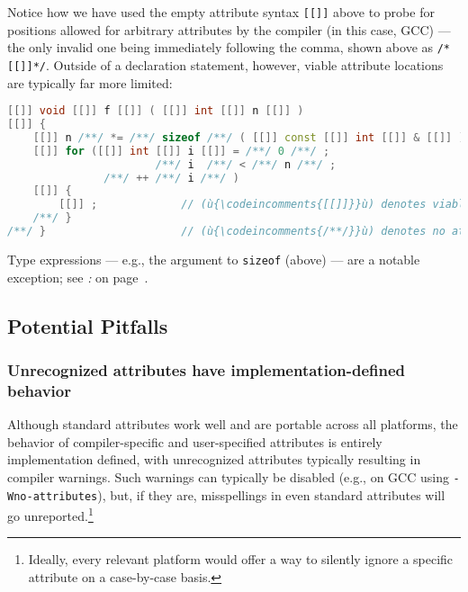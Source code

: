 \noindent Notice how we have used the empty attribute syntax \texttt{[[]]} above
to probe for positions allowed for arbitrary attributes by the compiler
(in this case, GCC) --- the only invalid one being immediately following
the comma, shown above as \texttt{/*[[]]*/}. Outside of a declaration
statement, however, viable attribute locations are typically far more
limited:

\begin{lstlisting}[language=C++,label=attribute-gcc-example]
[[]] void [[]] f [[]] ( [[]] int [[]] n [[]] )
[[]] {
    [[]] n /**/ *= /**/ sizeof /**/ ( [[]] const [[]] int [[]] & [[]] ) /**/;
    [[]] for ([[]] int [[]] i [[]] = /**/ 0 /**/ ;
                       /**/ i  /**/ < /**/ n /**/ ;
               /**/ ++ /**/ i /**/ )
    [[]] {
        [[]] ;             // (ù{\codeincomments{[[]]}}ù) denotes viable attribute location (on GCC)
    /**/ }
/**/ }                     // (ù{\codeincomments{/**/}}ù) denotes no attribute allowed (on GCC)
\end{lstlisting}

\noindent Type expressions --- e.g., the argument to \texttt{sizeof} (above) ---
are a notable exception; see {\it{}:} {\it{}} on page~\pageref{not-every-syntactic-location-is-viable-for-an-attribute}.

\subsection[Potential Pitfalls]{Potential Pitfalls}\label{attribute-potential-pitfalls}

\subsubsection[Unrecognized attributes have implementation-defined behavior]{Unrecognized attributes have implementation-defined behavior}\label{unrecognized-attributes-have-implementation-defined-behavior}

Although standard attributes work well and are portable across all
platforms, the behavior of compiler-specific and user-specified
attributes is entirely implementation defined, with unrecognized
attributes typically resulting in compiler warnings. Such warnings can typically be disabled (e.g., on GCC using
\texttt{-Wno-attributes}), but, if they are, misspellings in even standard
attributes will go unreported.{\cprotect\footnote{Ideally, every relevant platform would offer a way to silently ignore a specific
  attribute on a case-by-case basis.}}

